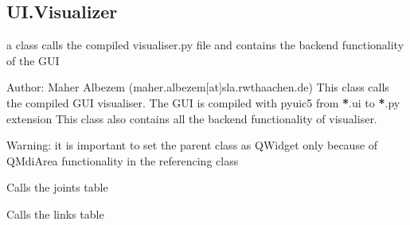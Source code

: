 \documentclass[letterpaper,10pt,english]{sphinxmanual}
\begin{document}
\subsection{UI.Visualizer}
\label{\detokenize{api:module-beamon.ui.callVisualizer}}\label{\detokenize{api:ui-visualizer}}

\begin{fulllineitems}
\label{\detokenize{api:beamon.ui.callVisualizer.VisualizerMainForm}}
a class calls the compiled visualiser.py file and contains the backend functionality of the GUI

Author: Maher Albezem (maher.albezem{[}at{]}sla.rwth\sphinxhyphen{}aachen.de)
This class calls the compiled GUI visualiser.
The GUI is compiled with pyuic5 from {\color{red}\bfseries{}*}.ui to {\color{red}\bfseries{}*}.py extension
This class also contains all the back\sphinxhyphen{}end functionality of visualiser.

Warning: it is important to set the parent class as QWidget only because of QMdiArea functionality
in the referencing class

\begin{fulllineitems}
\label{\detokenize{api:beamon.ui.callVisualizer.VisualizerMainForm.change_joints}}
Calls the joints table

\end{fulllineitems}


\begin{fulllineitems}
\label{\detokenize{api:beamon.ui.callVisualizer.VisualizerMainForm.change_links}}
Calls the links table


\end{fulllineitems}
\end{fulllineitems}
\end{document}
